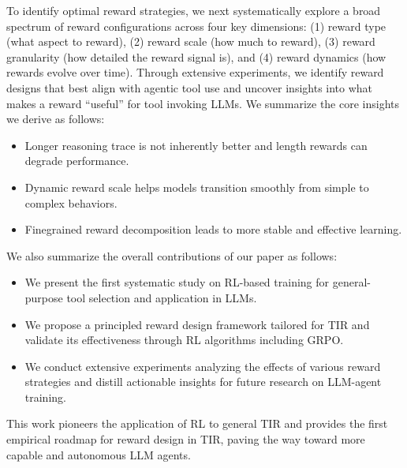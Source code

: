 To identify optimal reward strategies, we next systematically explore a broad spectrum of reward configurations across four key dimensions: (1) reward type (what aspect to reward), (2) reward scale (how much to reward), (3) reward granularity (how detailed the reward signal is), and (4) reward dynamics (how rewards evolve over time). Through extensive experiments, we identify reward designs that best align with agentic tool use and uncover insights into what makes a reward ``useful'' for tool invoking LLMs. We summarize the core insights we derive as follows:
\begin{itemize}[topsep=2pt, leftmargin=10pt, itemsep=-2pt]
    \item Longer reasoning trace is not inherently better and length rewards can degrade performance.
    \item Dynamic reward scale helps models transition smoothly from simple to complex behaviors.
    \item Finegrained reward decomposition leads to more stable and effective learning.
\end{itemize}
We also summarize the overall contributions of our paper as follows:
\begin{itemize}[topsep=2pt, leftmargin=10pt, itemsep=-2pt]
    \item We present the first systematic study on RL-based training for general-purpose tool selection and application in LLMs.
    \item We propose a principled reward design framework tailored for TIR and validate its effectiveness through RL algorithms including GRPO.
    \item We conduct extensive experiments analyzing the effects of various reward strategies and distill actionable insights for future research on LLM-agent training.
\end{itemize}
This work pioneers the application of RL to general TIR and provides the first empirical roadmap for reward design in TIR, paving the way toward more capable and autonomous LLM agents.





